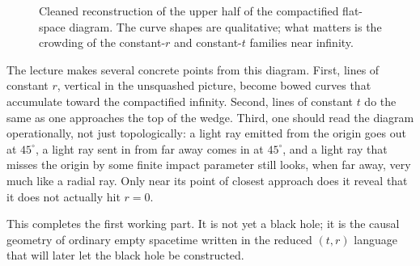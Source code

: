 \begin{figure}[ht]
\centering
{}
\caption{Cleaned reconstruction of the upper half of the compactified flat-space diagram. The curve shapes are qualitative; what matters is the crowding of the constant-\(r\) and constant-\(t\) families near infinity.}
\end{figure}

The lecture makes several concrete points from this diagram. First, lines of constant \(r\), vertical in the unsquashed picture, become bowed curves that accumulate toward the compactified infinity. Second, lines of constant \(t\) do the same as one approaches the top of the wedge. Third, one should read the diagram operationally, not just topologically: a light ray emitted from the origin goes out at \(45^\circ\), a light ray sent in from far away comes in at \(45^\circ\), and a light ray that misses the origin by some finite impact parameter still looks, when far away, very much like a radial ray. Only near its point of closest approach does it reveal that it does not actually hit \(r=0\).

This completes the first working part. It is not yet a black hole; it is the causal geometry of ordinary empty spacetime written in the reduced \((t,r)\) language that will later let the black hole be constructed.

